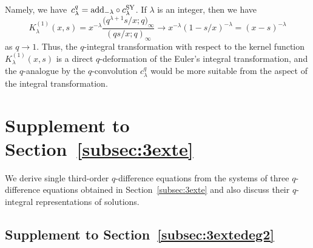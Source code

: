 \documentclass[pdftex]{sigma}
\numberwithin{equation}{section}
\theoremstyle{definition}
\begin{document}
Namely, we have~${c^{q} _{\lambda} = {\rm add}_{-\lambda } \circ c^{\rm SY} _{\lambda} }$.
If $\lambda $ is an integer, then we have
\begin{equation*}
K^{(1)}_{\lambda}(x, s) = x^{-\lambda } \frac{\bigl(q^{\lambda+1}s/x;q\bigr)_{\infty}}{(qs/x;q)_{\infty}} \to x^{-\lambda } (1-s/x) ^{-\lambda } = (x-s)^{-\lambda }
\end{equation*}
as $q \to 1$.
Thus, the $q$-integral transformation with respect to the kernel function $K^{(1)}_{\lambda}(x, s) $ is a direct $q$-deformation of the Euler's integral transformation, and the $q$-analogue by the $q$\nobreakdash-convolution $c^{q} _{\lambda} $ would be more suitable from the aspect of the integral transformation.

\section[Supplement to Section 4.6]{Supplement to Section~\ref{subsec:3exte}} \label{appsec:B}

We derive single third-order $q$-difference equations from the systems of three $q$-difference equations obtained in Section~\ref{subsec:3exte} and also discuss their $q$-integral representations of solutions.

\subsection[Supplement to Section 4.6.1]{Supplement to Section~\ref{subsec:3extedeg2}}
\end{document}
